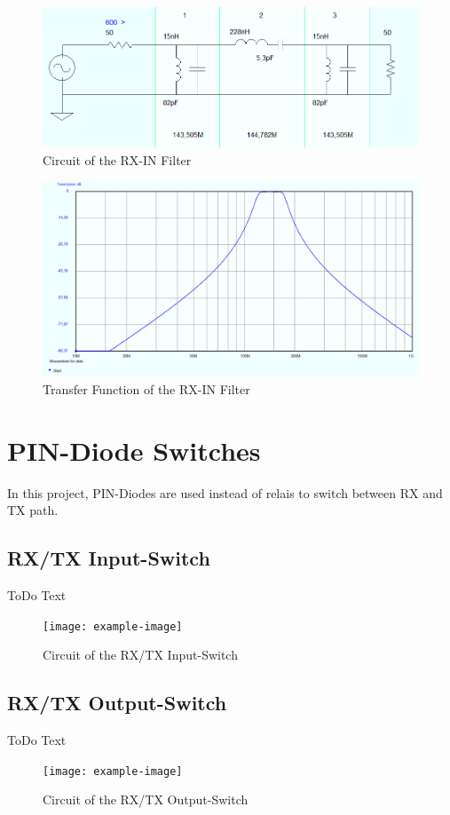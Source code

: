 \begin{figure}[ht!]
	\centering
	\includegraphics[width = 17cm]{./2_circuit/fig/RX-IN Filter_Circuit}
	\caption{Circuit of the RX-IN Filter}
	\label{fig:RX-IN Filter_Circuit}
\end{figure}
\bigskip
\begin{figure}[ht!]
	\centering
	\includegraphics[width = 17cm]{./2_circuit/fig/RX-IN Filter_TF}
	\caption{Transfer Function of the RX-IN Filter}
	\label{fig:RX-IN Filter_TF}
\end{figure}

\newpage
\section{PIN-Diode Switches}
In this project, PIN-Diodes are used instead of relais to switch between RX and TX path.
\subsection{RX/TX Input-Switch}
ToDo Text
\begin{figure}[ht!]
	\centering
	\texttt{[image: example-image]}
	\caption{Circuit of the RX/TX Input-Switch}
	\label{fig:RX/TX Input-Switch}
\end{figure}

\newpage
\subsection{RX/TX Output-Switch}
ToDo Text
\begin{figure}[ht!]
	\centering
	\texttt{[image: example-image]}
	\caption{Circuit of the RX/TX Output-Switch}
	\label{fig:RX/TX Output-Switch}
\end{figure}